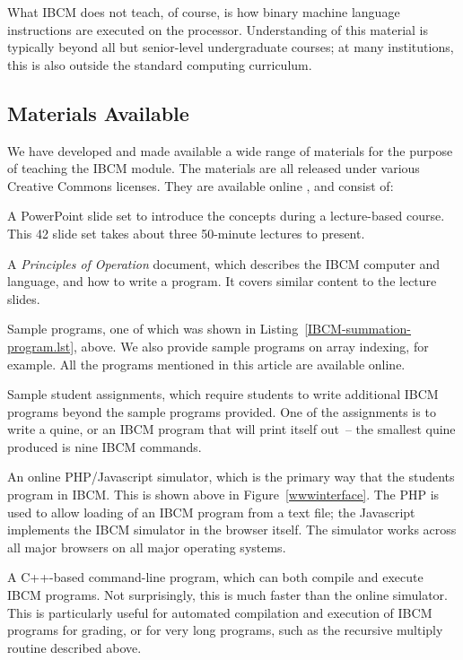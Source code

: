 What IBCM does not teach, of course, is how binary machine
language instructions are executed on the processor.  Understanding of
this material is typically beyond all but senior-level undergraduate
courses; at many institutions, this is also outside the
standard computing curriculum.

\subsection{Materials Available}

We have developed and made available a wide range of materials for the
purpose of teaching the IBCM module.  The materials are all released
under various Creative Commons licenses.  They are available online
\cite{ibcm-website}, and consist of:

\begin{itemlist}
\item A PowerPoint slide set to introduce the concepts during a
  lecture-based course.  This 42 slide set takes about three 50-minute
  lectures to present.
\item A {\em Principles of Operation} document, which describes the
  IBCM computer and language, and how to write a program.
  It covers similar content to the lecture slides.
\item Sample programs, one of which was shown in
  Listing~\ref{IBCM-summation-program.lst}, above.  We also provide sample programs
  on array indexing, for example.  All the programs mentioned in this
  article are available online.
\item Sample student assignments, which require students to
  write additional IBCM programs beyond the sample programs provided.
  One of the assignments is to write a quine, or an IBCM program that
  will print itself out~-- the smallest quine produced is nine IBCM
  commands.
\item An online PHP/Javascript simulator, which is the primary way that
  the students program in IBCM.  This is shown above in
  Figure~\ref{wwwinterface}.  The PHP is used to allow loading of an
  IBCM program from a text file; the Javascript implements the IBCM
  simulator in the browser itself.  The simulator works across all
  major browsers on all major operating systems.
\item A C++-based command-line program, which can both compile and
  execute IBCM programs.  Not surprisingly, this is much faster than
  the online simulator.  This is particularly useful for automated
  compilation and execution of IBCM programs for grading, or for very
  long programs, such as the recursive multiply routine described
  above.
\end{itemlist}

